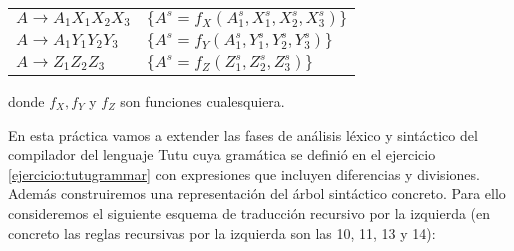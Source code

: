 \vspace{0.5cm}
\begin{tabular}{ll}
$A   \rightarrow A_1 X_1 X_2 X_3$  & $ \{ A^s = f_X(A^s_1, X_1^s, X_2^s, X_3^s) \}$ \\
$A   \rightarrow A_1 Y_1 Y_2 Y_3$  & $ \{ A^s = f_Y(A^s_1, Y_1^s, Y_2^s, Y_3^s) \}$ \\
$A   \rightarrow Z_1 Z_2 Z_3$      & $ \{ A^s = f_Z(Z_1^s, Z_2^s, Z_3^s) \}$
\end{tabular}
\vspace{0.5cm}

donde $f_X, f_Y$ y $f_Z$ son funciones cualesquiera.

\label{practica:recizq}
En esta práctica  vamos a 
extender las fases de análisis léxico y sintáctico del 
compilador del lenguaje Tutu cuya gramática se definió
en el ejercicio \ref{ejercicio:tutugrammar} 
con expresiones que incluyen diferencias 
y divisiones. Además construiremos una representación
del árbol sintáctico concreto.
Para ello consideremos el siguiente esquema de traducción
recursivo por la izquierda (en concreto las reglas recursivas
por la izquierda son las 10, 11, 13 y 14):

